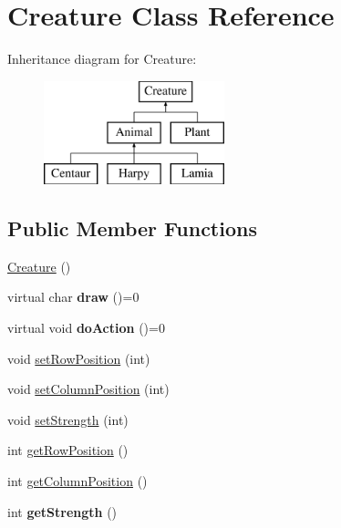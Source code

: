 \hypertarget{class_creature}{}\section{Creature Class Reference}
\label{class_creature}
Inheritance diagram for Creature\+:\begin{figure}[H]
\begin{center}
\leavevmode
\includegraphics[height=3.000000cm]{class_creature}
\end{center}
\end{figure}
\subsection*{Public Member Functions}
\begin{DoxyCompactItemize}
\item 
\hyperlink{class_creature_a597cc3b08ee17de46c3e7ec3cf0d9b58}{Creature} ()
\item 
virtual char {\bfseries draw} ()=0\hypertarget{class_creature_a5be2a9f038cd7641974462a80a009198}{}\label{class_creature_a5be2a9f038cd7641974462a80a009198}

\item 
virtual void {\bfseries do\+Action} ()=0\hypertarget{class_creature_ae40c732ab8eccea97404b9282fdd1138}{}\label{class_creature_ae40c732ab8eccea97404b9282fdd1138}

\item 
void \hyperlink{class_creature_a1bc33218a560eff8162a2e795e90251f}{set\+Row\+Position} (int)
\item 
void \hyperlink{class_creature_a4ab0c6b21b0826ed9691583eec078bec}{set\+Column\+Position} (int)
\item 
void \hyperlink{class_creature_a032ac31736090da076da0ec1466c27bf}{set\+Strength} (int)
\item 
int \hyperlink{class_creature_a8062f777315929e10e5d626e95366438}{get\+Row\+Position} ()
\item 
int \hyperlink{class_creature_addfbfaf75df9268fa1288c29c50abcd0}{get\+Column\+Position} ()
\item 
int {\bfseries get\+Strength} ()\hypertarget{class_creature_aae311cca00cca409e3e790a96ad14b97}{}\label{class_creature_aae311cca00cca409e3e790a96ad14b97}

\end{DoxyCompactItemize}


